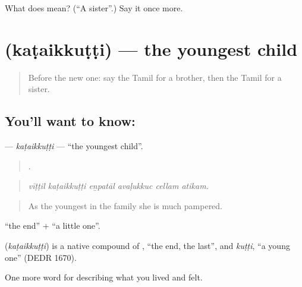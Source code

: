 \begin{tcolorbox}[breakable,colback=teal!4,colframe=teal!35!black,title={Before you move on}]
What does  mean? (\textquotedblleft{}A sister\textquotedblright{}.) Say it once more.
\end{tcolorbox}
\section[\texorpdfstring{\ta{கடைக்குட்டி} (kaṭaikkuṭṭi)}{கடைக்குட்டி (kaṭaikkuṭṭi)}]{ (kaṭaikkuṭṭi) — the youngest child}

\label{lesson:TA-C492-kataikkutti}



\begin{quote}
Before the new one: say the Tamil for a brother, then the Tamil for a sister.
\end{quote}

\subsection*{You'll want to know: }
\textbf{} — \emph{kaṭaikkuṭṭi} — \textquotedblleft{}the youngest child\textquotedblright{}.

\begin{quote}
     .
\end{quote}

\begin{quote}
\emph{vīṭṭil kaṭaikkuṭṭi eṉpatāl avaḷukkuc cellam atikam.}
\end{quote}

\begin{quote}
As the youngest in the family she is much pampered.
\end{quote}

 \textquotedblleft{}the end\textquotedblright{} +  \textquotedblleft{}a little one\textquotedblright{}.

\begin{cousinweb}
\textbf{} (\emph{kaṭaikkuṭṭi}) is a native compound of , \textquotedblleft{}the end, the last\textquotedblright{}, and  \emph{kuṭṭi}, \textquotedblleft{}a young one\textquotedblright{} (DEDR 1670).
\end{cousinweb}

\begin{grammarlens}[title={What you've built}]
One more word for describing what you lived and felt.
\end{grammarlens}


